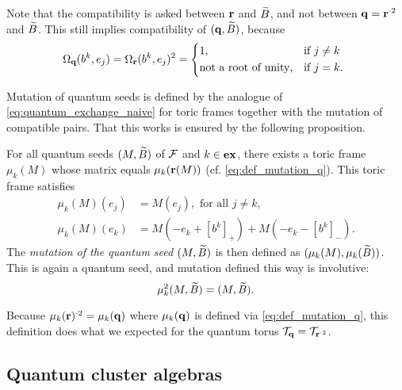 \begin{remark}
	Note that the compatibility is asked between $\mathbf{r}$ and $\widetilde{B}$, and not between $\mathbf{q} = \mathbf{r}^{\cdot 2}$ and $\widetilde{B}$. This still implies compatibility of $(\mathbf{q}, \widetilde{B})$, because
	\begin{equation*}
		\Omega_\bbq(b^k, e_j) = \Omega_\bbr(b^k, e_j)^2 = \begin{dcases*}
			1,                          & if $j \neq k$ \\
			\text{not a root of unity}, & if $j = k$.
		\end{dcases*}
	\end{equation*}
\end{remark}

Mutation of quantum seeds is defined by the analogue of
\cref{eq:quantum_exchange_naive} for toric frames together with the mutation of
compatible pairs. That this works is ensured by the following proposition.
\begin{proposition}\label{prop:formula_for_mutation}

	For all quantum seeds $(M, \widetilde{B})$ of $\mathcal{F}$ and $k\in \mathbf{ex}$, there exists a toric frame
	$\mu_k(M)$ whose matrix equals $\mu_k(\mathbf{r}(M))$ (cf. \cref{eq:def_mutation_q}). This
	toric frame satisfies
	\begin{align*}
		\mu_k(M)(e_j) & = M(e_j), \text{ for all } j \neq k,         \\
		\mu_k(M)(e_k) & = M(-e_k + [b^k]_{+}) + M(-e_k - [b^k]_{-}).
	\end{align*}
	The \emph{mutation of the quantum seed} $(M, \widetilde{B})$ is then
	defined as $(\mu_k(M), \mu_k(\widetilde{B}))$. This is again a quantum seed, and mutation defined
	this way is involutive:
	\begin{equation*}
		\mu^2_k (M, \widetilde{B}) = (M, \widetilde{B}).
	\end{equation*}
\end{proposition}
\begin{remark}

	Because $\mu_k(\mathbf{r})^{\cdot 2} = \mu_k(\mathbf{q})$ where $\mu_k(\mathbf{q})$ is defined via
	\cref{eq:def_mutation_q}, this definition does what we expected for the quantum torus
	$\mathcal{T}_{\mathbf{q}} = \mathcal{T}_{\mathbf{r}^{\cdot 2}}$.
\end{remark}

\subsection{Quantum cluster algebras}

